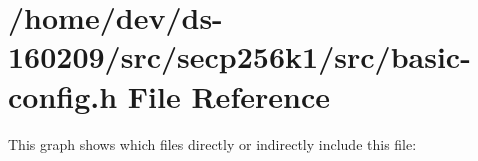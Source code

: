 \hypertarget{basic-config_8h}{}\section{/home/dev/ds-\/160209/src/secp256k1/src/basic-\/config.h File Reference}
\label{basic-config_8h}
This graph shows which files directly or indirectly include this file\+:
